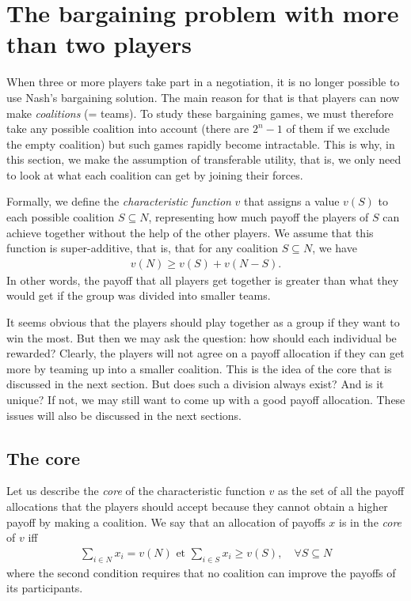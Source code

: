 \section{The bargaining problem with more than two players}



When three or more players take part in a negotiation, it is no longer possible to use Nash's bargaining solution. The main reason for that is that players can now make \emph{coalitions} (= teams). To study these bargaining games, we must therefore take any possible coalition into account (there are $2^n-1$ of them if we exclude the empty coalition) but such games rapidly become intractable. This is why, in this section, we make the assumption of transferable utility, that is, we only need to look at what each coalition can get by joining their forces.

Formally, we define the \emph{characteristic function} $v$ that assigns a value $v(S)$ to each possible coalition $S \subseteq N$, representing how much payoff the players of $S$ can achieve together without the help of the other players. We assume that this function is super-additive, that is, that for any coalition $S \subseteq N$, we have
\begin{align*}
	v(N) \geq v(S) + v(N-S).
\end{align*}
In other words, the payoff that all players get together is greater than what they would get if the group was divided into smaller teams. 

It seems obvious that the players should play together as a group if they want to win the most. But then we may ask the question: how should each individual be rewarded? Clearly, the players will not agree on a payoff allocation if they can get more by teaming up into a smaller coalition. This is the idea of the core that is discussed in the next section. But does such a division always exist? And is it unique? If not, we may still want to come up with a good payoff allocation. These issues will also be discussed in the next sections.



\subsection{The core}



Let us describe the \emph{core} of the characteristic function $v$ as the set of all the payoff allocations that the players should accept because they cannot obtain a higher payoff by making a coalition. We say that an allocation of payoffs $x$ is in the \emph{core} of $v$ iff
\begin{align*}
	\sum_{i \in N}{x_i} = v(N) \text{ et } \sum_{i\in S}{x_i} \geq v(S), \quad \forall S \subseteq N
\end{align*} 
where the second condition requires that no coalition can improve the payoffs of its participants.

